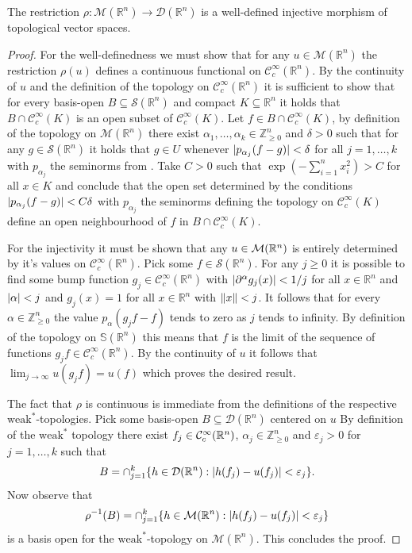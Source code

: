 \begin{lemma}
  The restriction $\rho: \mathcal{M}(\mathbb{R}^n)\to \mathcal{D}(\mathbb{R}^n)$
  is a well-defined injective morphism of topological vector spaces.
\end{lemma}
\begin{proof}
   For the well-definedness we must show that for any $u\in \mathcal{M}(\mathbb{R}^n)$ the restriction $\rho(u)$ defines a continuous functional on $\mathcal{C}_c^\infty(\mathbb{R}^n)$.
   By the continuity of $u$ and the definition of the topology on $\mathcal{C}_c^\infty(\mathbb{R}^n)$ it is sufficient to show that for every basis-open $B\subseteq \mathcal{S}(\mathbb{R}^n)$ and compact $K\subseteq \mathbb{R}^n$ it holds that $B\cap \mathcal{C}_c^\infty(K)$ is an open subset of $\mathcal{C}_c^\infty(K)$.
   Let $f\in B\cap \mathcal{C}_c^\infty(K)$, by definition of the topology on $\mathcal{M}(\mathbb{R}^n)$ there exist
   $\alpha_1,\ldots,\alpha_k\in \mathbb{Z}_{\geq 0}^n$ and $\delta >0$ such that for any $g\in\mathcal{S}(\mathbb{R}^n)$ it holds that $g\in U$ whenever $\vert p_{\alpha_j}(f-g) \vert<\delta$ for all $j=1,\ldots,k$ with $p_{\alpha_j}$ the seminorms from .
   Take $C>0$ such that $\exp(-\sum_{i=1}^n x_i^2)>C$ for all $x\in K$ and conclude that the open set determined by the conditions $\vert p_{\alpha_j}(f-g) \vert<C\delta$ with $p_{\alpha_j}$ the seminorms defining the topology on $\mathcal{C}_c^\infty(K)$ define an open neighbourhood of $f$ in $B\cap\mathcal{C}_c^\infty(K)$.

   For the injectivity it must be shown that any $u\in \mathcal{M}(\mathbb{R}^n)$ is entirely determined by it's values on $\mathcal{C}_c^\infty(\mathbb{R}^n)$.
   Pick some $f\in \mathcal{S}(\mathbb{R}^n)$.
   For any $j\geq 0$ it is possible to find some bump function $g_j\in \mathcal{C}_c^\infty(\mathbb{R}^n)$ with $\vert \partial^\alpha g_j(x) \vert<1/j$ for all $x\in\mathbb{R}^n$ and $\vert \alpha \vert <j$ and $g_j(x) = 1$ for all $x\in \mathbb{R}^n$ with $\Vert x \Vert<j$.
   It follows that for every $\alpha\in \mathbb{Z}_{\geq 0}^n$ the value $p_\alpha(g_jf - f)$ tends to zero as $j$ tends to infinity.
   By definition of the topology on $\mathbb{S}(\mathbb{R}^n)$ this means that $f$ is the limit of the sequence of functions $g_jf\in \mathcal{C}_c^\infty(\mathbb{R}^n)$.
   By the continuity of $u$ it follows that $\lim_{j\to \infty} u(g_jf) = u(f)$ which proves the desired result.

   The fact that $\rho$ is continuous is immediate from the definitions of the respective $\text{weak}^*$-topologies.
   Pick some basis-open $B\subseteq \mathcal{D}(\mathbb{R}^n)$ centered on $u$
   By definition of the $\text{weak}^*$ topology there exist $f_j\in \mathcal{C}_c^\infty(\mathbb{R}^n)$, $\alpha_j\in \mathbb{Z}^n_{\geq 0}$ and  $\varepsilon_j >0$ for $j=1,\ldots, k$ such that
   $$B = \cap_{j=1}^k \{h\in \mathcal{D}(\mathbb{R}^n): \vert h(f_j)-u(f_j) \vert <\varepsilon_j\}. $$
   Now observe that
   $$\rho^{-1}(B) = \cap_{j=1}^k \{h\in \mathcal{M}(\mathbb{R}^n): \vert h(f_j)-u(f_j) \vert <\varepsilon_j\}$$
   is a basis open for the $\text{weak}^*$-topology on $\mathcal{M}(\mathbb{R}^n)$.
   This concludes the proof.
\end{proof}
